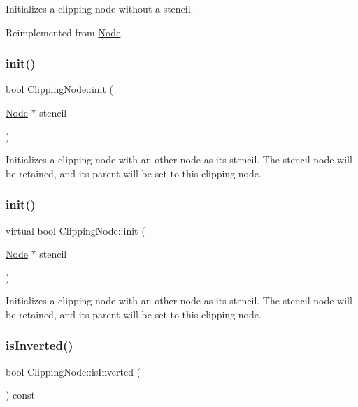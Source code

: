 Initializes a clipping node without a stencil. 

Reimplemented from \hyperlink{classNode}{Node}.

\mbox{\label{classClippingNode_aa3c1fb4afb7f0c63f123fc93f196c12c}} 
\subsubsection{\texorpdfstring{init()}{init()}\hspace{0.1cm}{\footnotesize\ttfamily [3/4]}}
{\footnotesize\ttfamily bool Clipping\+Node\+::init (\begin{DoxyParamCaption}\item[{\hyperlink{classNode}{Node} $\ast$}]{stencil }\end{DoxyParamCaption})\hspace{0.3cm}{\ttfamily [virtual]}}

Initializes a clipping node with an other node as its stencil. The stencil node will be retained, and its parent will be set to this clipping node. \mbox{\label{classClippingNode_a04ad4a1bdaa7a6ef272c62745896946a}} 
\subsubsection{\texorpdfstring{init()}{init()}\hspace{0.1cm}{\footnotesize\ttfamily [4/4]}}
{\footnotesize\ttfamily virtual bool Clipping\+Node\+::init (\begin{DoxyParamCaption}\item[{\hyperlink{classNode}{Node} $\ast$}]{stencil }\end{DoxyParamCaption})\hspace{0.3cm}{\ttfamily [virtual]}}

Initializes a clipping node with an other node as its stencil. The stencil node will be retained, and its parent will be set to this clipping node. \mbox{\label{classClippingNode_add176fbe7d1ef979d93ed5918159654f}} 
\subsubsection{\texorpdfstring{is\+Inverted()}{isInverted()}\hspace{0.1cm}{\footnotesize\ttfamily [1/2]}}
{\footnotesize\ttfamily bool Clipping\+Node\+::is\+Inverted (\begin{DoxyParamCaption}{ }\end{DoxyParamCaption}) const}

